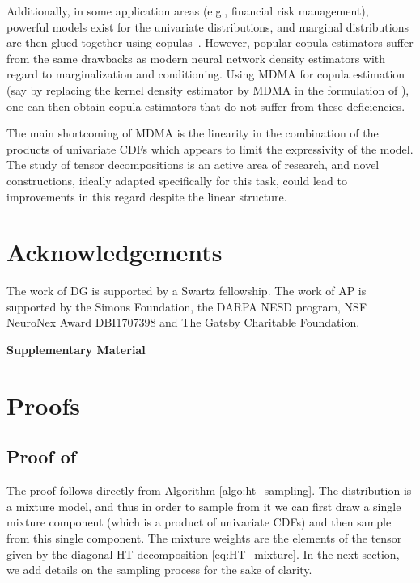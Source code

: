 \documentclass{article}
\begin{document}
Additionally, in some application areas (e.g., financial risk management), powerful models exist for the univariate distributions, and marginal distributions are then glued together using copulas~\cite{mcneil2015quantitative}.
However, popular copula estimators suffer from the same drawbacks as modern neural network density estimators with regard to marginalization and conditioning. Using MDMA for copula estimation (say by replacing the kernel density estimator by MDMA in the formulation of \cite{Geenens2017-tg}), one can then obtain copula estimators that do not suffer from these deficiencies. 

The main shortcoming of MDMA is the linearity in the combination of the products of univariate CDFs which appears to limit the expressivity of the model. The study of tensor decompositions is an active area of research, and novel constructions, ideally adapted specifically for this task, could lead to improvements in this regard despite the linear structure.  
\newpage 

\section*{Acknowledgements}

The work of DG is supported by a Swartz fellowship. 
The work of AP is supported by the Simons Foundation, the DARPA NESD program, NSF NeuroNex Award DBI1707398 and The Gatsby Charitable Foundation.   


\newpage

\appendix
{\Large \bf{Supplementary Material}}


\section{Proofs} \label{app:proofs}

\subsection{Proof of }

The proof follows directly from Algorithm \ref{algo:ht_sampling}. The distribution  is a mixture model, and thus in order to sample from it we can first draw a single mixture component (which is a product of univariate CDFs) and then sample from this single component. The mixture weights are the elements of the tensor  given by the diagonal HT decomposition \cref{eq:HT_mixture}. In the next section, we add details on the sampling process for the sake of clarity.
\end{document}
